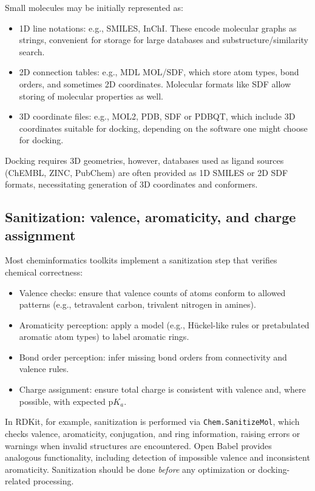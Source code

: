 \documentclass[12pt, a4paper]{article}
\begin{document}
Small molecules may be initially represented as:
\begin{itemize}
  \item 1D line notations: e.g., SMILES,\cite{CH6_Weininger1988} InChI.\cite{CH6_Heller2013} These encode molecular graphs as strings, convenient for storage for large databases and substructure/similarity search.
  \item 2D connection tables: e.g., MDL MOL/SDF, which store atom types, bond orders, and sometimes 2D coordinates. Molecular formats like SDF allow storing of molecular properties as well.
  \item 3D coordinate files: e.g., MOL2, PDB, SDF or PDBQT, which include 3D coordinates suitable for docking, depending on the software one might choose for docking.
\end{itemize}

Docking requires 3D geometries, however, databases used as ligand sources (ChEMBL, ZINC, PubChem) are often provided as 1D SMILES or 2D SDF formats, necessitating generation of 3D coordinates and conformers.\cite{CH6_Irwin2005,CH6_Gaulton2012,CH6_KimPubChem}

\subsection{Sanitization: valence, aromaticity, and charge assignment}

Most cheminformatics toolkits implement a sanitization step that verifies chemical correctness:
\begin{itemize}
  \item Valence checks: ensure that valence counts of atoms conform to allowed patterns (e.g., tetravalent carbon, trivalent nitrogen in amines).
  \item Aromaticity perception: apply a model (e.g., H\"uckel-like rules or pretabulated aromatic atom types) to label aromatic rings.
  \item Bond order perception: infer missing bond orders from connectivity and valence rules.
  \item Charge assignment: ensure total charge is consistent with valence and, where possible, with expected p$K_a$.
\end{itemize}

In RDKit, for example, sanitization is performed via \verb|Chem.SanitizeMol|, which checks valence, aromaticity, conjugation, and ring information, raising errors or warnings when invalid structures are encountered. Open Babel provides analogous functionality, including detection of impossible valence and inconsistent aromaticity.\cite{CH6_OBoyle2011} Sanitization should be done \emph{before} any optimization or docking-related processing. 
\end{document}
